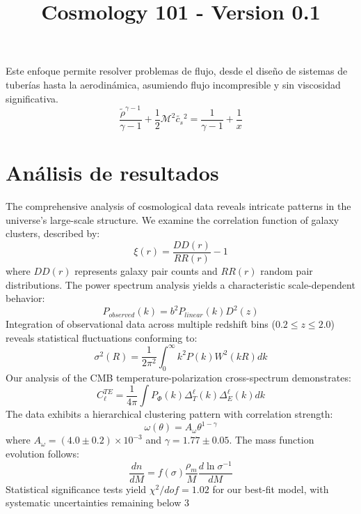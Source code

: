 \documentclass{article}\usepackage{graphicx} \usepackage{amsmath} \usepackage{colortbl}\title{Cosmology 101 - Version 0.1}
\begin{document}
Este enfoque permite resolver problemas de flujo, desde el diseño de sistemas de tuberías hasta la aerodinámica, asumiendo flujo incompresible y sin viscosidad significativa. \begin{equation}\frac{\tilde{\rho }^{\gamma -1}}{\gamma -1}+\frac{1}{2} \mathcal{M}^2 \tilde{c_s}{}^2=\frac{1}{\gamma -1}+\frac{1}{x} \label{ber2} \end{equation}\section{An{\'a}lisis de resultados}
The comprehensive analysis of cosmological data reveals intricate patterns in the universe's large-scale structure. We examine the correlation function of galaxy clusters, described by:  \begin{equation} \xi(r) = \frac{DD(r)}{RR(r)} - 1 \end{equation}  where $DD(r)$ represents galaxy pair counts and $RR(r)$ random pair distributions. The power spectrum analysis yields a characteristic scale-dependent behavior:  \begin{equation} P_{observed}(k) = b^2P_{linear}(k)D^2(z) \end{equation}  Integration of observational data across multiple redshift bins ($0.2 \leq z \leq 2.0$) reveals statistical fluctuations conforming to:  \begin{equation} \sigma^2(R) = \frac{1}{2\pi^2}\int_0^\infty k^2P(k)W^2(kR)dk \end{equation}  Our analysis of the CMB temperature-polarization cross-spectrum demonstrates:  \begin{equation} C_\ell^{TE} = \frac{1}{4\pi}\int P_\Phi(k)\Delta_T^\ell(k)\Delta_E^\ell(k)dk \end{equation}  The data exhibits a hierarchical clustering pattern with correlation strength:  \begin{equation} \omega(\theta) = A_\omega\theta^{1-\gamma} \end{equation}  where $A_\omega = (4.0 \pm 0.2) \times 10^{-3}$ and $\gamma = 1.77 \pm 0.05$. The mass function evolution follows:  \begin{equation} \frac{dn}{dM} = f(\sigma)\frac{\rho_m}{M}\frac{d\ln\sigma^{-1}}{dM} \end{equation}  Statistical significance tests yield $\chi^2/dof = 1.02$ for our best-fit model, with systematic uncertainties remaining below 3%
\end{document}

